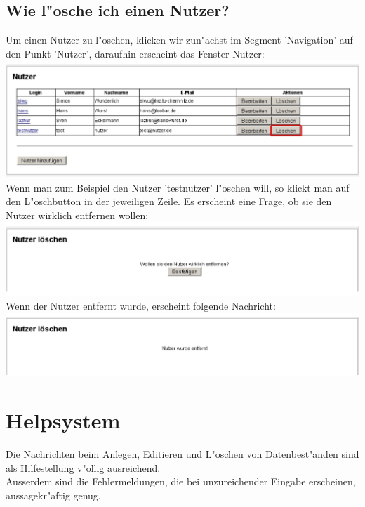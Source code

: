 \subsection{Wie l"osche ich einen Nutzer?}  
Um einen Nutzer zu l"oschen, klicken wir zun"achst im Segment 'Navigation' auf den Punkt 'Nutzer', daraufhin erscheint das Fenster 
Nutzer:\\
\includegraphics[scale=0.5]{nutzerloe}\\
Wenn man zum Beispiel den Nutzer 'testnutzer' l"oschen will, so klickt man auf den L"oschbutton in der jeweiligen Zeile.
Es erscheint eine Frage, ob sie den Nutzer wirklich entfernen wollen:\\
\includegraphics[scale=0.5]{nutzerloe2}\\
Wenn der Nutzer entfernt wurde, erscheint folgende Nachricht:\\
\includegraphics[scale=0.5]{nutzerloe3}

\section{Helpsystem}
Die Nachrichten beim Anlegen, Editieren und L"oschen von Datenbest"anden sind als Hilfestellung v"ollig ausreichend.\\
Ausserdem sind die Fehlermeldungen, die bei unzureichender Eingabe erscheinen, aussagekr"aftig genug.





